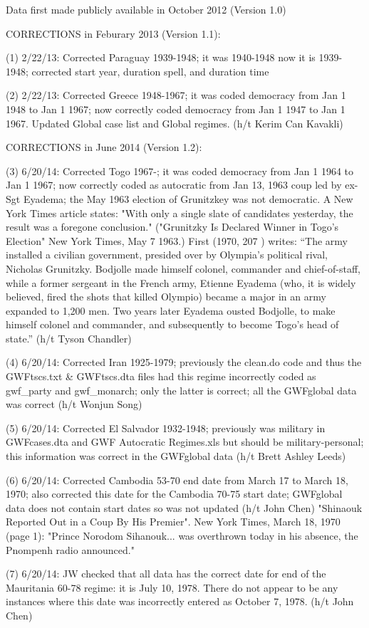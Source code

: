 Data first made publicly available in October 2012 (Version 1.0)


CORRECTIONS in Feburary 2013 (Version 1.1): 

(1) 2/22/13: Corrected Paraguay 1939-1948; it was 1940-1948 now it is 1939-1948; corrected start year, duration spell, and duration time

(2) 2/22/13: Corrected Greece 1948-1967; it was coded democracy from Jan 1 1948 to Jan 1 1967; now correctly coded democracy from Jan 1 1947 to Jan 1 1967. Updated Global case list and Global regimes. (h/t Kerim Can Kavakli)


CORRECTIONS in June 2014 (Version 1.2): 

(3) 6/20/14: Corrected Togo 1967-; it was coded democracy from Jan 1 1964 to Jan 1 1967; now correctly coded as autocratic from Jan 13, 1963 coup led by ex-Sgt Eyadema; the May 1963 election of Grunitzkey was not democratic. A New York Times article states: "With only a single slate of candidates yesterday, the result was a foregone conclusion."  ("Grunitzky Is Declared Winner in Togo's Election" New York Times, May 7 1963.)  First (1970, 207 ) writes: ``The army installed a civilian government, presided over by Olympia's political rival, Nicholas Grunitzky. Bodjolle made himself colonel, commander and chief-of-staff, while a former sergeant in the French army, Etienne Eyadema (who, it is widely believed, fired the shots that killed Olympio) became a major in an army expanded to 1,200 men. Two years later Eyadema ousted Bodjolle, to make himself colonel and commander, and subsequently to become Togo's head of state.'' (h/t Tyson Chandler)

(4) 6/20/14: Corrected Iran 1925-1979; previously the clean.do code and thus the GWFtscs.txt & GWFtscs.dta files had this regime incorrectly coded as gwf_party and gwf_monarch; only the latter is correct; all the GWFglobal data was correct (h/t Wonjun Song)

(5) 6/20/14: Corrected El Salvador 1932-1948; previously was military in GWFcases.dta and GWF Autocratic Regimes.xls but should be military-personal; this information was correct in the GWFglobal data (h/t Brett Ashley Leeds)

(6) 6/20/14: Corrected Cambodia 53-70 end date from March 17 to March 18, 1970; also corrected this date for the Cambodia 70-75 start date; GWFglobal data does not contain start dates so was not updated  (h/t John Chen) "Shinaouk Reported Out in a Coup By His Premier". New York Times, March 18, 1970 (page 1): "Prince Norodom Sihanouk... was overthrown today in his absence, the Pnompenh radio announced."

(7) 6/20/14: JW checked that all data has the correct date for end of the Mauritania 60-78 regime: it is July 10, 1978.  There do not appear to be any instances where this date was incorrectly entered as October 7, 1978. (h/t John Chen) 

